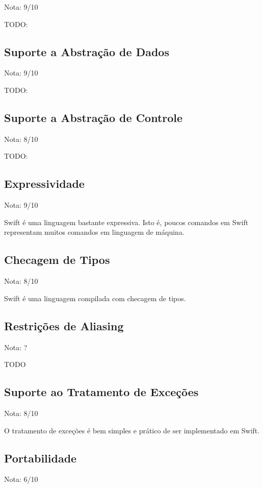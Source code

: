 \documentclass[rel_mlp]{iiufrgs}
\begin{document}
Nota: 9/10

TODO:

\subsection{Suporte a Abstração de Dados}

Nota: 9/10

TODO:

\subsection{Suporte a Abstração de Controle}

Nota: 8/10

TODO:

\subsection{Expressividade}

Nota: 9/10

Swift é uma linguagem bastante expressiva. Isto é, poucos comandos em Swift representam muitos comandos em linguagem de máquina.

\subsection{Checagem de Tipos}

Nota: 8/10

Swift é uma linguagem compilada com checagem de tipos.

\subsection{Restrições de Aliasing}

Nota: ?

TODO

\subsection{Suporte ao Tratamento de Exceções}

Nota: 8/10

O tratamento de exceções é bem simples e prático de ser implementado em Swift.

\subsection{Portabilidade}

Nota: 6/10
\end{document}

